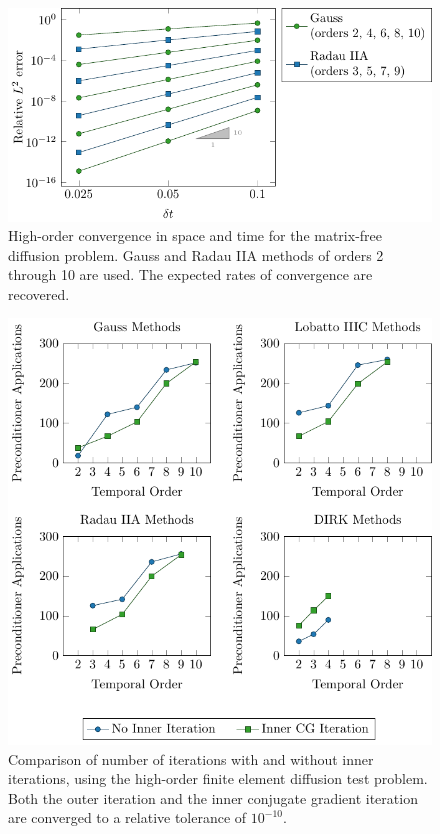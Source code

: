 \documentclass[review]{siamart}
\begin{document}
\begin{figure}
	\centering
	\includegraphics{figures/high_order_diff_error_plot/ho_diff_errors}
	\caption{
		High-order convergence in space and time for the matrix-free diffusion problem.
		Gauss and Radau IIA methods of orders 2 through 10 are used.
		The expected rates of convergence are recovered.
	}
	\label{fig:high-order-diff-errors}
\end{figure}

\begin{figure}
	\centering
	\includegraphics{figures/high_order_diff_iters/high_order_diff_iters}
	\caption{
		Comparison of number of iterations with and without inner iterations, using the high-order finite element diffusion test problem.
		Both the outer iteration and the inner conjugate gradient iteration are converged to a relative tolerance of $10^{-10}$.
	}
	\label{fig:high-order-diff-iters}
\end{figure}
\end{document}
